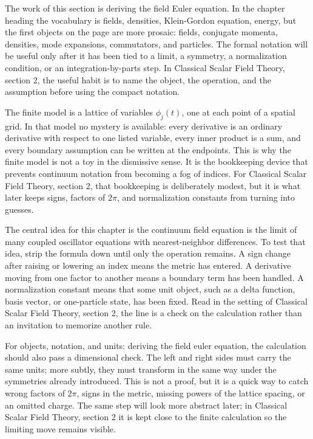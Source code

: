The work of this section is deriving the field Euler equation.  In the chapter heading the vocabulary is fields, densities, Klein-Gordon equation, energy, but the first objects on the page are more prosaic: fields, conjugate momenta, densities, mode expansions, commutators, and particles.  The formal notation will be useful only after it has been tied to a limit, a symmetry, a normalization condition, or an integration-by-parts step.  In Classical Scalar Field Theory, section 2, the useful habit is to name the object, the operation, and the assumption before using the compact notation.

The finite model is a lattice of variables \(\phi_j(t)\), one at each point of a spatial grid.  In that model no mystery is available: every derivative is an ordinary derivative with respect to one listed variable, every inner product is a sum, and every boundary assumption can be written at the endpoints.  This is why the finite model is not a toy in the dismissive sense.  It is the bookkeeping device that prevents continuum notation from becoming a fog of indices.  For Classical Scalar Field Theory, section 2, that bookkeeping is deliberately modest, but it is what later keeps signs, factors of \(2\pi\), and normalization constants from turning into guesses.

The central idea for this chapter is the continuum field equation is the limit of many coupled oscillator equations with nearest-neighbor differences.  To test that idea, strip the formula down until only the operation remains.  A sign change after raising or lowering an index means the metric has entered.  A derivative moving from one factor to another means a boundary term has been handled.  A normalization constant means that some unit object, such as a delta function, basis vector, or one-particle state, has been fixed.  Read in the setting of Classical Scalar Field Theory, section 2, the line is a check on the calculation rather than an invitation to memorize another rule.

For objects, notation, and units: deriving the field euler equation, the calculation should also pass a dimensional check.  The left and right sides must carry the same units; more subtly, they must transform in the same way under the symmetries already introduced.  This is not a proof, but it is a quick way to catch wrong factors of \(2\pi\), signs in the metric, missing powers of the lattice spacing, or an omitted charge.  The same step will look more abstract later; in Classical Scalar Field Theory, section 2 it is kept close to the finite calculation so the limiting move remains visible.

